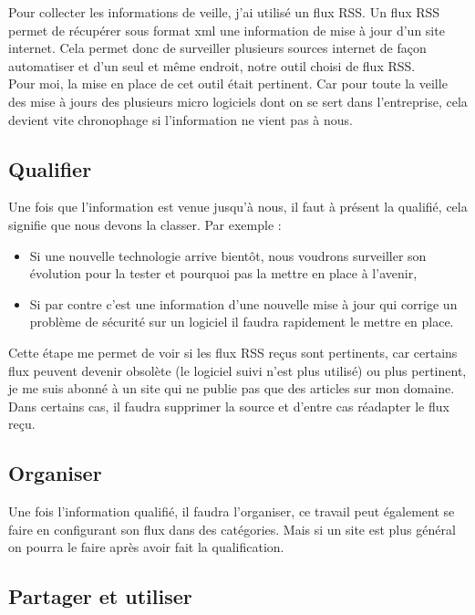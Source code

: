 \documentclass[11pt,a4paper,oneside]{book}
\begin{document}
Pour collecter les informations de veille, j'ai utilisé un flux RSS.
Un flux RSS permet de récupérer sous format xml une information de mise à jour d'un site internet. Cela permet donc de surveiller plusieurs sources internet de façon automatiser et d'un seul et même endroit, notre outil choisi de flux RSS. \\
Pour moi, la mise en place de cet outil était pertinent. Car pour toute la veille des mise à jours des plusieurs micro logiciels dont on se sert dans l'entreprise, cela devient vite chronophage si l'information ne vient pas à nous.

\subsection{Qualifier}

Une fois que l'information est venue jusqu'à nous, il faut à présent la qualifié, cela signifie que nous devons la classer.
Par exemple :
\begin{itemize}
\item Si une nouvelle technologie arrive bientôt, nous voudrons surveiller son évolution pour la tester et pourquoi pas la mettre en place à l'avenir,
\item Si par contre c'est une information d'une nouvelle mise à jour qui corrige un problème de  sécurité sur un logiciel il faudra rapidement le mettre en place.
\end{itemize}
Cette étape me permet de voir si les flux RSS reçus sont pertinents, car certains flux peuvent devenir obsolète (le logiciel suivi n'est plus utilisé) ou plus pertinent, je me suis abonné à un site qui ne publie pas que des articles sur mon domaine. \\
Dans certains cas, il faudra supprimer la source et d'entre cas réadapter le flux reçu.

\subsection{Organiser}

Une fois l'information qualifié, il faudra l'organiser, ce travail peut également se faire en configurant son flux dans des catégories. Mais si un site est plus général on pourra le faire après avoir fait la qualification.

\subsection{Partager et utiliser}
\end{document}
